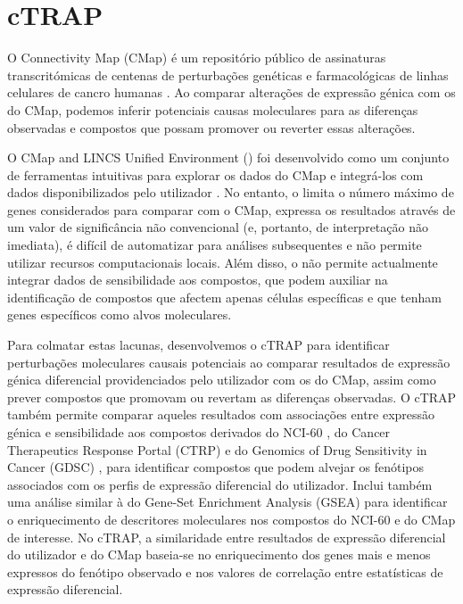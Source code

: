 \section*{cTRAP}

O Connectivity Map (CMap) é um repositório público de assinaturas transcritómicas de centenas de perturbações genéticas e farmacológicas de linhas celulares de cancro humanas \cite{subramanian:2017ul}. Ao comparar alterações de expressão génica com os do CMap, podemos inferir potenciais causas moleculares para as diferenças observadas e compostos que possam promover ou reverter essas alterações.

O CMap and LINCS Unified Environment () foi desenvolvido como um conjunto de ferramentas intuitivas para explorar os dados do CMap e integrá-los com dados disponibilizados pelo utilizador \cite{subramanian:2017ul}. No entanto, o  limita o número máximo de genes considerados para comparar com o CMap, expressa os resultados através de um valor de significância não convencional (e, portanto, de interpretação não imediata), é difícil de automatizar para análises subsequentes e não permite utilizar recursos computacionais locais. Além disso, o  não permite actualmente integrar dados de sensibilidade aos compostos, que podem auxiliar na identificação de compostos que afectem apenas células específicas e que tenham genes específicos como alvos moleculares.

Para colmatar estas lacunas, desenvolvemos o cTRAP para identificar perturbações moleculares causais potenciais ao comparar resultados de expressão génica diferencial providenciados pelo utilizador com os do CMap, assim como prever compostos que promovam ou revertam as diferenças observadas. O cTRAP também permite comparar aqueles resultados com associações entre expressão génica e sensibilidade aos compostos derivados do NCI-60 \cite{shoemaker:2006wi}, do Cancer Therapeutics Response Portal (CTRP) \cite{seashore-ludlow:2015ws} e do Genomics of Drug Sensitivity in Cancer (GDSC) \cite{yang:2012vk}, para identificar compostos que podem alvejar os fenótipos associados com os perfis de expressão diferencial do utilizador. Inclui também uma análise similar à do Gene-Set Enrichment Analysis (GSEA) \cite{subramanian:2005wu} para identificar o enriquecimento de descritores moleculares nos compostos do NCI-60 e do CMap de interesse. No cTRAP, a similaridade entre resultados de expressão diferencial do utilizador e do CMap baseia-se no enriquecimento dos genes mais e menos expressos do fenótipo observado \cite{subramanian:2017ul,subramanian:2005wu} e nos valores de correlação entre estatísticas de expressão diferencial.

